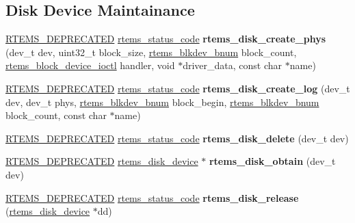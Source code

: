 \subsection*{Disk Device Maintainance}
\begin{DoxyCompactItemize}
\item 
\mbox{\label{group__rtems__disk_ga330315aae2e07465844961b5b07c0997}} 
\mbox{\hyperlink{group__RTEMSScoreBaseDefs_gab651a076d4d51d50221e7ef7ac99d4e7}{R\+T\+E\+M\+S\+\_\+\+D\+E\+P\+R\+E\+C\+A\+T\+ED}} \mbox{\hyperlink{group__ClassicStatus_ga545d41846817eaba6143d52ee4d9e9fe}{rtems\+\_\+status\+\_\+code}} {\bfseries rtems\+\_\+disk\+\_\+create\+\_\+phys} (dev\+\_\+t dev, uint32\+\_\+t block\+\_\+size, \mbox{\hyperlink{group__rtems__disk_ga5fbcfd40b657bff6c54d9e393fab3274}{rtems\+\_\+blkdev\+\_\+bnum}} block\+\_\+count, \mbox{\hyperlink{group__rtems__disk_gacbf717f10129b976deaf8e6f4deb17ad}{rtems\+\_\+block\+\_\+device\+\_\+ioctl}} handler, void $\ast$driver\+\_\+data, const char $\ast$name)
\item 
\mbox{\label{group__rtems__disk_ga9455178cd1ca961448b51a648f01b303}} 
\mbox{\hyperlink{group__RTEMSScoreBaseDefs_gab651a076d4d51d50221e7ef7ac99d4e7}{R\+T\+E\+M\+S\+\_\+\+D\+E\+P\+R\+E\+C\+A\+T\+ED}} \mbox{\hyperlink{group__ClassicStatus_ga545d41846817eaba6143d52ee4d9e9fe}{rtems\+\_\+status\+\_\+code}} {\bfseries rtems\+\_\+disk\+\_\+create\+\_\+log} (dev\+\_\+t dev, dev\+\_\+t phys, \mbox{\hyperlink{group__rtems__disk_ga5fbcfd40b657bff6c54d9e393fab3274}{rtems\+\_\+blkdev\+\_\+bnum}} block\+\_\+begin, \mbox{\hyperlink{group__rtems__disk_ga5fbcfd40b657bff6c54d9e393fab3274}{rtems\+\_\+blkdev\+\_\+bnum}} block\+\_\+count, const char $\ast$name)
\item 
\mbox{\label{group__rtems__disk_ga70b459de72364a665099dbda9fe0e4c6}} 
\mbox{\hyperlink{group__RTEMSScoreBaseDefs_gab651a076d4d51d50221e7ef7ac99d4e7}{R\+T\+E\+M\+S\+\_\+\+D\+E\+P\+R\+E\+C\+A\+T\+ED}} \mbox{\hyperlink{group__ClassicStatus_ga545d41846817eaba6143d52ee4d9e9fe}{rtems\+\_\+status\+\_\+code}} {\bfseries rtems\+\_\+disk\+\_\+delete} (dev\+\_\+t dev)
\item 
\mbox{\label{group__rtems__disk_ga583a17bf7c398f7476d90abfcbeaaa67}} 
\mbox{\hyperlink{group__RTEMSScoreBaseDefs_gab651a076d4d51d50221e7ef7ac99d4e7}{R\+T\+E\+M\+S\+\_\+\+D\+E\+P\+R\+E\+C\+A\+T\+ED}} \mbox{\hyperlink{structrtems__disk__device}{rtems\+\_\+disk\+\_\+device}} $\ast$ {\bfseries rtems\+\_\+disk\+\_\+obtain} (dev\+\_\+t dev)
\item 
\mbox{\label{group__rtems__disk_gab4c411292a6d198fdc1223f199a34186}} 
\mbox{\hyperlink{group__RTEMSScoreBaseDefs_gab651a076d4d51d50221e7ef7ac99d4e7}{R\+T\+E\+M\+S\+\_\+\+D\+E\+P\+R\+E\+C\+A\+T\+ED}} \mbox{\hyperlink{group__ClassicStatus_ga545d41846817eaba6143d52ee4d9e9fe}{rtems\+\_\+status\+\_\+code}} {\bfseries rtems\+\_\+disk\+\_\+release} (\mbox{\hyperlink{structrtems__disk__device}{rtems\+\_\+disk\+\_\+device}} $\ast$dd)
\end{DoxyCompactItemize}
